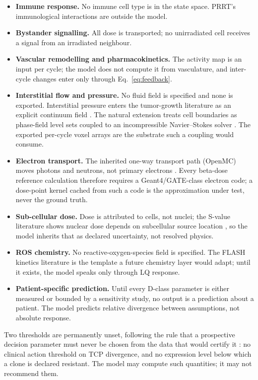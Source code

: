 \documentclass[11pt]{article}
\begin{document}
\begin{itemize}
\item \textbf{Immune response.} No immune cell type is in the state space. PRRT's immunological interactions are
outside the model.
\item \textbf{Bystander signalling.} All dose is transported; no unirradiated cell
receives a signal from an irradiated neighbour.
\item \textbf{Vascular remodelling and pharmacokinetics.} The activity map is an input
per cycle; the model does not compute it from vasculature, and inter-cycle changes enter
only through Eq.~\ref{eq:feedback}.
\item \textbf{Interstitial flow and pressure.} No fluid field is specified
and none is exported. Interstitial pressure enters the tumor-growth
literature as an explicit continuum field \cite{li2026chns}. The natural
extension treats cell boundaries as phase-field level sets coupled to an
incompressible Navier--Stokes solver \cite{shen2022diffuse}. The exported
per-cycle voxel arrays are the substrate such a coupling would consume.
\item \textbf{Electron transport.} The inherited one-way transport path (OpenMC) moves
photons and neutrons, not primary electrons \cite{kinder2026biofilm}. Every beta-dose
reference calculation therefore requires a Geant4/GATE-class electron code; a dose-point
kernel cached from such a code is the approximation under test, never the ground truth.
\item \textbf{Sub-cellular dose.} Dose is attributed to cells, not nuclei; the
S-value literature shows nuclear dose depends on subcellular source location
\cite{tamborino2020}, so the model inherits that as declared uncertainty, not resolved
physics.
\item \textbf{ROS chemistry.} No reactive-oxygen-species field is specified. The FLASH
kinetics literature \cite{zhang2025flash} is the template a future chemistry layer would
adapt; until it exists, the model speaks only through LQ response.
\item \textbf{Patient-specific prediction.} Until every D-class parameter is either
measured or bounded by a sensitivity study, no output is a prediction about a patient.
The model predicts relative divergence between assumptions, not absolute response.
\end{itemize}

Two thresholds are permanently unset, following the rule that a prospective decision
parameter must never be chosen from the data that would certify it
\cite{kinder2026biofilm}: no clinical action threshold on TCP divergence, and no
expression level below which a clone is declared resistant. The model may compute such
quantities; it may not recommend them.
\end{document}
